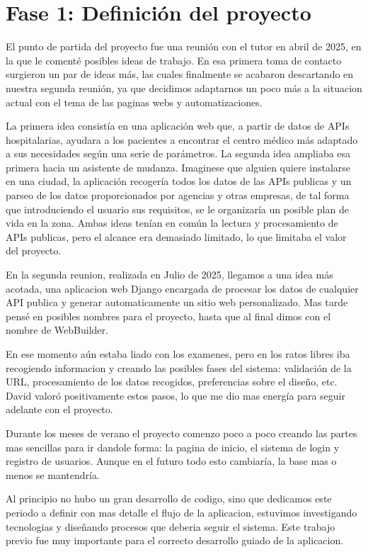 \section{Fase 1: Definición del proyecto}
\label{sec:definicion-proyecto}

El punto de partida del proyecto fue una reunión con el tutor en abril de 2025, en la que le comenté posibles ideas de trabajo.
En esa primera toma de contacto surgieron un par de ideas más, las cuales finalmente se acabaron descartando en nuestra segunda reunión,
ya que decidimos adaptarnos un poco más a la situacion actual con el tema de las paginas webs y automatizaciones.


La primera idea consistía en una aplicación web que, a partir de datos de APIs hospitalarias, ayudara a los pacientes a encontrar el centro 
médico más adaptado a sus necesidades según una serie de parámetros. 
La segunda idea ampliaba esa primera hacia un asistente de mudanza. Imaginese que alguien quiere instalarse en una ciudad, la aplicación
recogería todos los datos de las APIs publicas y un parseo de los datos proporcionados por agencias y otras empresas, de tal forma que 
introduciendo el usuario sus requisitos, se le organizaría un posible plan de vida en la zona.
Ambas ideas tenían en común la lectura y procesamiento de APIs publicas, pero el alcance era demasiado limitado, lo que limitaba el valor del 
proyecto. 


En la segunda reunion, realizada en Julio de 2025, llegamos a una idea más acotada, una aplicacion web Django encargada de procesar los datos
de cualquier API publica y generar automaticamente un sitio web personalizado. Mas tarde pensé en posibles nombres para el proyecto, hasta que 
al final dimos con el nombre de WebBuilder.


En ese momento aún estaba liado con los examenes, pero en los ratos libres iba recogiendo informacion y creando las posibles fases del sistema:
validación de la URL, procesamiento de los datos recogidos, preferencias sobre el diseño, etc. David valoró positivamente estos pasos, lo que 
me dio mas energía para seguir adelante con el proyecto.


Durante los meses de verano el proyecto comenzo poco a poco creando las partes mas sencillas para ir dandole forma: la pagina de inicio, el sistema de login y registro de usuarios. Aunque en el futuro todo esto cambiaría, la base mas  o menos se mantendría.

Al principio no hubo un gran desarrollo de codigo, sino que dedicamos este periodo a definir con mas detalle el flujo de la aplicacion, estuvimos investigando tecnologias y diseñando procesos que deberia seguir el sistema. Este trabajo previo fue muy importante para el correcto desarrollo guiado de la aplicacion.


